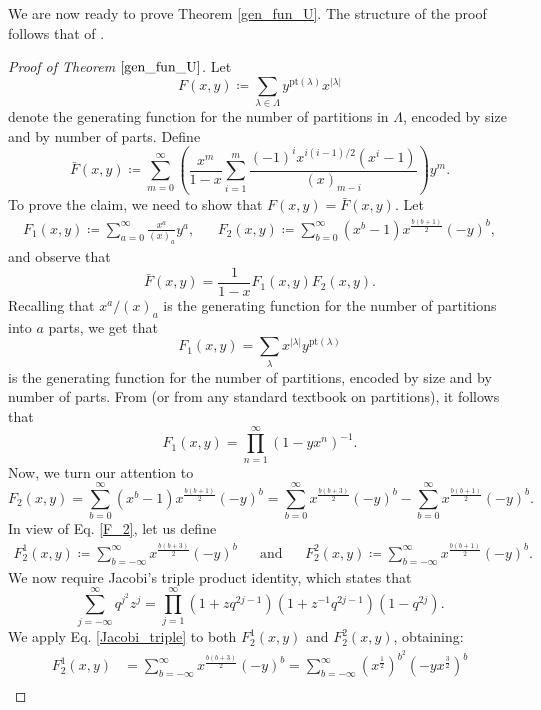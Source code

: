 \documentclass[a4paper, 12pt, oneside]{amsart}
\theoremstyle{definition}
\newcommand{\pt}{\mathrm{pt}}
\begin{document}
We are now ready to prove Theorem \ref{gen_fun_U}. The structure of the proof follows that of \cite[Theorem 1.3]{SpigaAGL}.
\begin{proof}[Proof of Theorem $\ref{gen_fun_U}$]
Let
$$F(x,y) \coloneqq \sum_{\lambda \in \Lambda }y^{\pt(\lambda)}x^{|\lambda|}$$
denote the generating function for the number of partitions in $\Lambda$, encoded by size and by number of parts. Define
$$\bar{F}(x,y)\coloneqq \sum_{m=0}^{\infty}\left( \frac{x^m}{1-x}\sum_{i=1}^{m}\frac{(-1)^{i}x^{i(i-1)/2}(x^i-1)}{(x)_{m-i}}\right)y^m.$$
To prove the claim, we need to show that $F(x,y)=\bar{F}(x,y)$. 
Let
\begin{align*}
F_1(x,y)\coloneqq\sum_{a=0}^{\infty}\frac{x^a}{(x)_a}y^a, &&F_2(x,y)\coloneqq\sum_{b=0}^{\infty}(x^b-1)x^{\frac{b(b+1)}{2}}(-y)^b,
\end{align*}
and observe that
\begin{equation}
\label{F_bar}
\bar{F}(x,y)=\frac{1}{1-x}F_1(x,y)F_2(x,y).
\end{equation}
Recalling that $x^a/(x)_a$ is the generating function for the number of partitions into $a$ parts, we get that
$$F_1(x,y)=\sum_{\lambda}x^{|\lambda|}y^{\pt(\lambda)}$$
is the generating function for the number of partitions, encoded by size and by number of parts. From \cite[p.~16]{Andrews} (or from any standard textbook on partitions), it follows that
$$
F_1(x,y)=\prod_{n=1}^{\infty}(1-yx^n)^{-1}.
$$
Now, we turn our attention to 
\begin{equation}
    \label{F_2}
F_2(x,y)=\sum_{b=0}^{\infty}(x^b-1)x^{\frac{b(b+1)}{2}}(-y)^b=\sum_{b=0}^{\infty}x^{\frac{b(b+3)}{2}}(-y)^b-\sum_{b=0}^{\infty}x^{\frac{b(b+1)}{2}}(-y)^b.
\end{equation}
In view of Eq. \eqref{F_2}, let us define
\begin{align*}
F_2^1(x,y)\coloneqq\sum_{b=-\infty}^{\infty}x^{\frac{b(b+3)}{2}}(-y)^b &&\text{and} &&F_2^2(x,y) \coloneqq\sum_{b=-\infty}^{\infty}x^{\frac{b(b+1)}{2}}(-y)^b.
\end{align*}
We now require Jacobi's triple product identity, which states that
\begin{equation}
\label{Jacobi_triple}
\sum_{j=-\infty}^{\infty}q^{j^2}z^j=\prod_{j=1}^{\infty}(1+zq^{2j-1})(1+z^{-1}q^{2j-1})(1-q^{2j}).
\end{equation}
We apply Eq. \eqref{Jacobi_triple} to both $F_2^1(x,y)$ and $F_2^2(x,y)$, obtaining:
\begin{align*}
F_2^1(x,y)&=\sum_{b=-\infty}^{\infty}x^{\frac{b(b+3)}{2}}(-y)^b=\sum_{b=-\infty}^{\infty}(x^{\frac{1}{2}})^{b^2}(-yx^{\frac{3}{2}})^b \\

\end{align*}
\end{proof}
\end{document}
